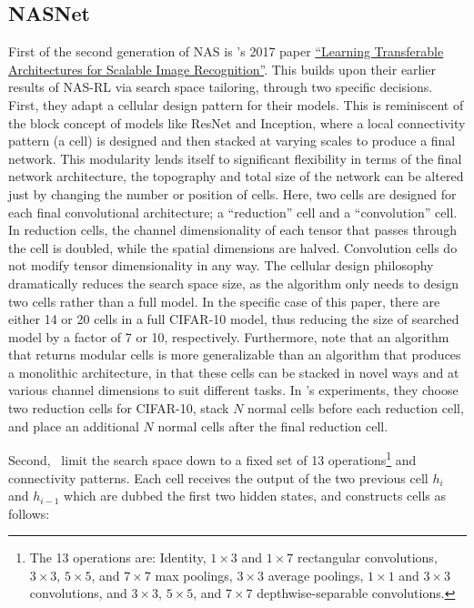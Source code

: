 \subsection{NASNet}
First of the second generation of NAS is \citeauthor{zoph_sir2017}'s 2017 paper \hyperlink{cite.zoph_sir2017}{``Learning Transferable Architectures for Scalable
Image Recognition''}. This builds upon their earlier results of NAS-RL via search space tailoring,
through two specific decisions. First, they adapt a cellular design pattern for their models.
This is reminiscent of the block concept of models like ResNet and Inception, where a local connectivity pattern (a cell) is
designed and then stacked at varying scales to produce a final network. This modularity lends itself to significant flexibility
in terms of the final network architecture, the topography and total size of the
network can be altered just by changing the number or position of cells. Here, two cells are designed for
each final convolutional architecture; a ``reduction'' cell and a ``convolution'' cell. In reduction cells, the channel dimensionality
of each tensor that passes through the cell is doubled, while the spatial dimensions are halved. Convolution cells do not modify
tensor dimensionality in any way. The cellular design philosophy dramatically reduces the search space size, as the
algorithm only needs to design two cells rather than a full model. In the specific case of this paper, there are
either 14 or 20 cells in a full CIFAR-10 model, thus reducing the size of searched model by a factor of 7 or 10,
respectively. Furthermore, \citeauthor{zoph_sir2017} note that an algorithm that returns modular cells is more generalizable than
an algorithm that produces a monolithic architecture, in that these cells can be stacked in novel ways and at various channel dimensions
to suit different tasks. In \citeauthor{zoph_sir2017}'s experiments, they choose two reduction cells for CIFAR-10, stack $N$ normal cells before each reduction cell,
and place an additional $N$ normal cells after the final reduction cell.

Second,~\citeauthor{zoph_sir2017} limit the search space down to a fixed set of 13 operations\footnote{The 13 operations are: Identity, $1\times3$
    and $1\times7$ rectangular convolutions, $3\times3$, $5\times5$, and $7\times7$ max poolings, $3\times3$ average poolings,
    $1\times1$ and $3\times3$ convolutions, and $3\times3$, $5\times5$, and $7\times7$ depthwise-separable convolutions.}
and connectivity patterns. Each cell receives the output of the two previous cell $h_i$ and $h_{i-1}$ which are dubbed the first two
hidden states, and constructs cells as follows:

